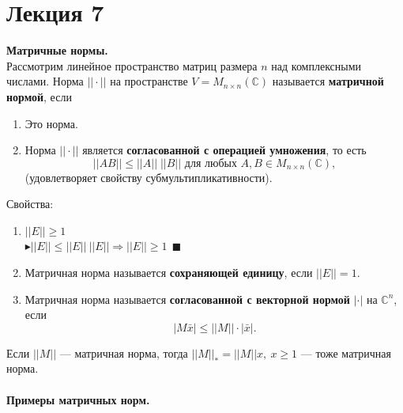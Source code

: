\documentclass[12pt]{article}
\theoremstyle{definition}
\numberwithin{equation}{section}
\begin{document}
	\section *{Лекция 7}
	\noindent \textbf{Матричные нормы.}\\
	Рассмотрим линейное пространство матриц размера $n$ над комплексными числами. Норма $||\cdot||$ на пространстве $V=M_{n\times n}(\mathbb{C})$ называется \textbf{матричной нормой}, если \begin{enumerate}[start=0]
		\item Это норма.
		\item Норма $||\cdot ||$ является \textbf{согласованной с операцией умножения}, то есть $$||AB|| \leq ||A|| \; ||B|| \text{ для любых } A, B \in M_{n\times n}(\mathbb{C}),$$ (удовлетворяет свойству субмультипликативности).\end{enumerate}
	Свойства:\begin{enumerate}
		\item  $||E||\geqslant1$\\
		$\blacktriangleright ||E||\leqslant||E||~||E|| \Rightarrow ||E||\geqslant1~~\blacksquare$
		\item Матричная норма называется \textbf{сохраняющей единицу}, если $||E||=1.$
		\item Матричная норма называется \textbf{согласованной с векторной нормой} $|\cdot|$ на $\mathbb{C}^n$, если $$|M\bar x|\leqslant||M||\cdot |\bar x|.$$
	\end{enumerate}
	Если $||M||$ --- матричная норма, тогда $||M||_*=||M||x,~x\geqslant1$ --- тоже матричная норма.\\
	\\
	\textbf{Примеры матричных норм.}
\end{document}
